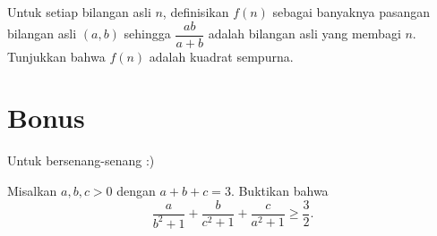 \documentclass[11pt]{scrartcl}
\begin{document}
	\begin{soalbaru}
	Untuk setiap bilangan asli $n$, definisikan $f(n)$ sebagai banyaknya pasangan bilangan asli $(a,b)$ sehingga $\dfrac{ab}{a+b}$ adalah bilangan asli yang membagi $n$. Tunjukkan bahwa $f(n)$ adalah kuadrat sempurna.
	\end{soalbaru}
	
	\section{Bonus}
	Untuk bersenang-senang :)
	\begin{soalbaru}
	Misalkan $a,b,c > 0$ dengan $a+b+c=3$. Buktikan bahwa 
	$$\dfrac{a}{b^2+1}+\dfrac{b}{c^2+1}+\dfrac{c}{a^2+1} \ge \dfrac{3}{2}.$$
	\end{soalbaru}
\end{document}
